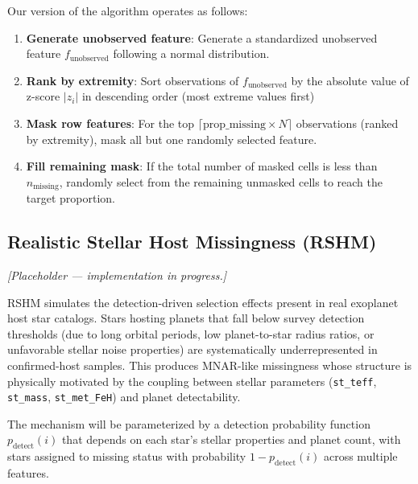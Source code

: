 \documentclass[preprint]{aastex631}
\begin{document}
Our version of the algorithm operates as follows:

\begin{enumerate}
  \item \textbf{Generate unobserved feature}: Generate a standardized unobserved feature $f_{\text{unobserved}}$ following a normal distribution.
  \item \textbf{Rank by extremity}: Sort observations of $f_{\text{unobserved}}$ by the absolute value of z-score $|z_i|$ in descending order (most extreme values first)
  \item \textbf{Mask row features}: For the top $\lceil \text{prop\_missing} \times N \rceil$ observations (ranked by extremity), mask all but one randomly selected feature.
  \item \textbf{Fill remaining mask}: If the total number of masked cells is less than $n_{\text{missing}}$, randomly select from the remaining unmasked cells to reach the target proportion.
\end{enumerate}

\subsection{Realistic Stellar Host Missingness (RSHM)}

\textit{[Placeholder — implementation in progress.]}

RSHM simulates the detection-driven selection effects present in real exoplanet host star catalogs. Stars hosting planets that fall below survey detection thresholds (due to long orbital periods, low planet-to-star radius ratios, or unfavorable stellar noise properties) are systematically underrepresented in confirmed-host samples. This produces MNAR-like missingness whose structure is physically motivated by the coupling between stellar parameters (\texttt{st\_teff}, \texttt{st\_mass}, \texttt{st\_met\_FeH}) and planet detectability.

The mechanism will be parameterized by a detection probability function $p_{\text{detect}}(i)$ that depends on each star's stellar properties and planet count, with stars assigned to missing status with probability $1 - p_{\text{detect}}(i)$ across multiple features.


\end{document}
